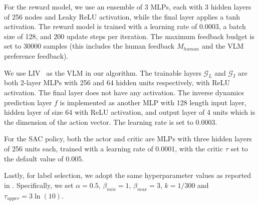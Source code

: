 For the reward model, we use an ensemble of 3 MLPs, each with 3 hidden layers of 256 nodes and Leaky ReLU activation, while the final layer applies a tanh activation. The reward model is trained with a learning rate of 0.0003, a batch size of 128, and 200 update steps per iteration. The maximum feedback budget is set to 30000 samples (this includes the human feedback $M_{human}$ and the VLM preference feedback).

We use LIV~\cite{ma2023liv} as the VLM in our algorithm. The trainable layers $\mathcal{G}_L$ and $\mathcal{G}_I$ are both 2-layer MLPs with 256 and 64 hidden units respectively, with ReLU activation. The final layer does not have any activation. The inverse dynamics prediction layer $f$ is implemented as another MLP with 128 length input layer, hidden layer of size 64 with ReLU activation, and output layer of 4 units which is the dimension of the action vector. The learning rate is set to 0.0003. 

For the SAC policy, both the actor and critic are MLPs with three hidden layers of 256 units each, trained with a learning rate of 0.0001, with the critic $\tau$ set to the default value of 0.005.

Lastly, for label selection, we adopt the same hyperparameter values as reported in \cite{cheng2024rime}. Specifically, we set $\alpha = 0.5$, $\beta_{min} = 1$,  $\beta_{max} = 3$, $k = 1/300$ and $\tau_{upper} = 3\ln(10)$. 